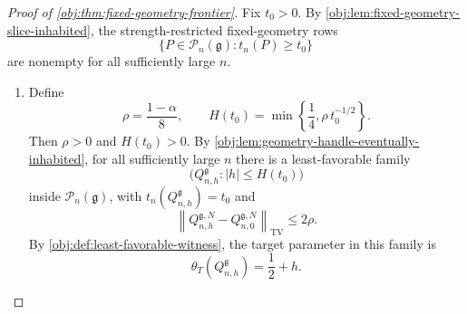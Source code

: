 \documentclass[11pt]{article}
\begin{document}
\begin{proof}[Proof of \cref{obj:thm:fixed-geometry-frontier}]
Fix \(t_0>0\).  By \cref{obj:lem:fixed-geometry-slice-inhabited}, the strength-restricted fixed-geometry rows
\[
\bigl\{P\in\mathcal P_n(\mathfrak g):t_n(P)\ge t_0\bigr\}
\]
are nonempty for all sufficiently large \(n\).

\begin{enumerate}
\item Define
\[
\rho=\frac{1-\alpha}{8},
\qquad
H(t_0)=\min\left\{\frac14,\rho\,t_0^{-1/2}\right\}.
\]
Then \(\rho>0\) and \(H(t_0)>0\).  By \cref{obj:lem:geometry-handle-eventually-inhabited}, for all sufficiently large \(n\) there is a least-favorable family
\[
\bigl(Q_{n,h}^{\mathfrak g}: |h|\le H(t_0)\bigr)
\]
inside \(\mathcal P_n(\mathfrak g)\), with \(t_n(Q_{n,h}^{\mathfrak g})=t_0\) and
\[
\left\|Q_{n,h}^{\mathfrak g,N}-Q_{n,0}^{\mathfrak g,N}\right\|_{\mathrm{TV}}
\le 2\rho .
\]
By \cref{obj:def:least-favorable-witness}, the target parameter in this family is
\[
\theta_T(Q_{n,h}^{\mathfrak g})=\frac12+h .
\]


\end{enumerate}
\end{proof}
\end{document}
